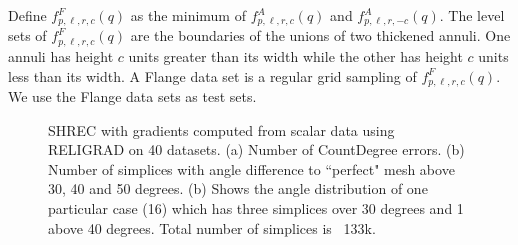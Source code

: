 Define $f^F_{p,\ell,r,c}(q)$ as the minimum
of $f^A_{p,\ell,r,c}(q)$ and $f^A_{p,\ell,r,-c}(q)$.
The level sets of $f^F_{p,\ell,r,c}(q)$ are the boundaries
of the unions of two thickened annuli.
One annuli has height $c$ units greater than its width
while the other has height $c$ units less than its width.
A Flange data set is a regular grid sampling of $f^F_{p,\ell,r,c}(q)$. 
We use the Flange data sets as test sets.

\begin{figure}[tb]
	\caption{SHREC with gradients computed from scalar data using RELIGRAD on 40 datasets. (a) Number of CountDegree errors. (b) Number of simplices with angle difference to ``perfect" mesh above 30, 40 and 50 degrees. (b) Shows the angle distribution of one particular case (16) which has three simplices over 30 degrees and 1 above 40 degrees. Total number of simplices is ~133k.}\label{fig:flangeAngle}
\end{figure}

